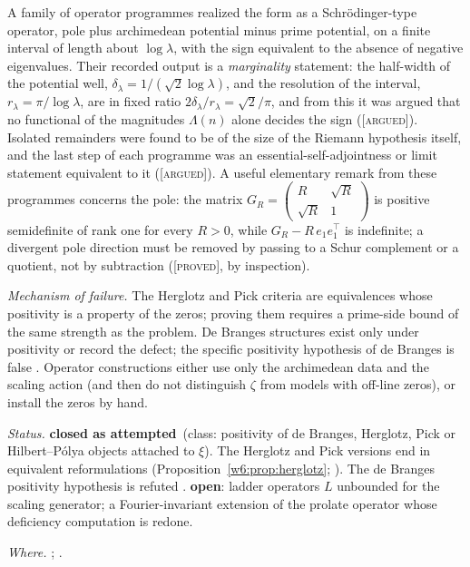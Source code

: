 \documentclass[11pt]{amsart}
\theoremstyle{definition}
\theoremstyle{remark}
\numberwithin{equation}{section}
\newcommand{\stag}[1]{\textsc{[#1]}}
\newcommand{\PROVED}{\stag{proved}}
\newcommand{\ARGUED}{\stag{argued}}
\newcommand{\rtag}[1]{\textbf{\small\textsf{#1}}}
\newcommand{\closedA}{\rtag{closed as attempted}}
\newcommand{\openR}{\rtag{open}}
\newcommand{\entry}[1]{\par\smallskip\noindent\textit{#1.}\enspace}
\begin{document}
A family of operator programmes realized the form as a Schr\"odinger-type operator, pole plus
archimedean potential minus prime potential, on a finite interval of length about $\log\lambda$,
with the sign equivalent to the absence of negative eigenvalues. Their recorded output is a
\emph{marginality} statement: the half-width of the potential well, $\delta_\lambda=1/(\sqrt2\log\lambda)$,
and the resolution of the interval, $r_\lambda=\pi/\log\lambda$, are in fixed ratio
$2\delta_\lambda/r_\lambda=\sqrt2/\pi$, and from this it was argued that no functional of the
magnitudes $\Lambda(n)$ alone decides the sign (\ARGUED). Isolated remainders were found to be of
the size of the Riemann hypothesis itself, and the last step of each programme was an
essential-self-adjointness or limit statement equivalent to it (\ARGUED). A useful elementary
remark from these programmes concerns the pole: the matrix
$G_R=\begin{pmatrix}R&\sqrt R\\ \sqrt R&1\end{pmatrix}$ is positive semidefinite of rank one for
every $R>0$, while $G_R-R\,e_1e_1^{\!\top}$ is indefinite; a divergent pole direction must be
removed by passing to a Schur complement or a quotient, not by subtraction (\PROVED, by inspection).

\entry{Mechanism of failure} The Herglotz and Pick criteria are equivalences whose positivity is a
property of the zeros; proving them requires a prime-side bound of the same strength as the
problem. De Branges structures exist only under positivity or record the defect; the specific
positivity hypothesis of de Branges is false \cite{ConreyLi2000}. Operator constructions either
use only the archimedean data and the scaling action (and then do not distinguish $\zeta$ from
models with off-line zeros), or install the zeros by hand.

\entry{Status} \closedA\ (class: positivity of de Branges, Herglotz, Pick or Hilbert--P\'olya
objects attached to $\xi$). The Herglotz and Pick versions end in equivalent reformulations
(Proposition~\ref{w6:prop:herglotz}; \cite[Corollary~9.246]{P36}). The de Branges positivity
hypothesis is refuted \cite{ConreyLi2000}. \openR: ladder operators $L$ unbounded for the scaling
generator; a Fourier-invariant extension of the prolate operator whose deficiency computation is
redone.

\entry{Where} \cite{P18,P20,P35,P36}; \cite{deBranges1968,ConreyLi2000,Lagarias1999,Hinkkanen1997,
BerryKeating1999,Connes1999}.
\end{document}
